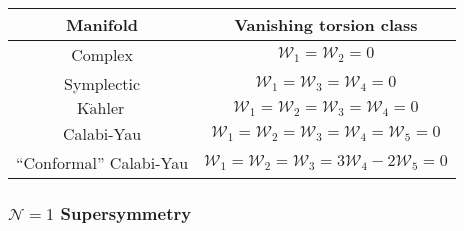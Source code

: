 \documentclass[12pt,a4paper]{book}
\newcommand{\Kahler}{\ensuremath{\text{K}\ddot{\text{a}}\text{hler}\,}}
\begin{document}
\begin{table}
\begin{center}
\begin{tabular}{|c|c|}
\hline
{\bf Manifold} & {\bf Vanishing torsion class}\\
\hline
Complex & $\mathcal{W}_1 = \mathcal{W}_2 = 0$ \\ 
\hline
Symplectic & $\mathcal{W}_1 = \mathcal{W}_3 = \mathcal{W}_4 = 0$ \\ 
\hline
\Kahler & $ \mathcal{W}_1 = \mathcal{W}_2 = \mathcal{W}_3 = \mathcal{W}_4 = 0$ \\
\hline
Calabi-Yau & $ \mathcal{W}_1 = \mathcal{W}_2 = \mathcal{W}_3 = \mathcal{W}_4 = \mathcal{W}_5 = 0$ \\
\hline
``Conformal'' Calabi-Yau & $ \mathcal{W}_1 = \mathcal{W}_2 = \mathcal{W}_3 = 3 \mathcal{W}_4 - 2 \mathcal{W}_5 = 0$ \\
\hline
\end{tabular}
\caption{ \label{tab:TorsionClasses}
}
\end{center}
\end{table}

\subsubsection*{$\mathcal{N} = 1$ Supersymmetry}
\label{sssec:N1SUSY}
\end{document}
